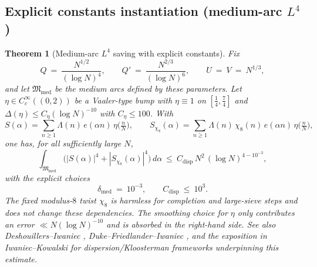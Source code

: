 \documentclass[11pt]{article}
\newtheorem{theorem}{Theorem}
\theoremstyle{definition}
\theoremstyle{remark}
\begin{document}
\subsection*{Explicit constants instantiation (medium-arc $L^4$)}
\begin{theorem}[Medium-arc $L^4$ saving with explicit constants]\label{thm:medium-dispersion-explicit}
Fix
\[
  Q\ =\ \frac{N^{1/2}}{(\log N)^4},\qquad Q'\ =\ \frac{N^{2/3}}{(\log N)^6},\qquad U\ =\ V\ =\ N^{1/3},
\]
and let $\mathfrak M_{\mathrm{med}}$ be the medium arcs defined by these parameters. Let $\eta\in C_c^{\infty}((0,2))$ be a Vaaler-type bump with $\eta\equiv 1$ on $[\tfrac14,\tfrac74]$ and $\Delta(\eta)\le C_{\eta}(\log N)^{-10}$ with $C_{\eta}\le 100$. With
\[
  S(\alpha)=\sum_{n\ge 1}\Lambda(n)\,e(\alpha n)\,\eta\!\big(\tfrac{n}{N}\big),\qquad
  S_{\chi_8}(\alpha)=\sum_{n\ge 1}\Lambda(n)\,\chi_8(n)\,e(\alpha n)\,\eta\!\big(\tfrac{n}{N}\big),
\]
one has, for all sufficiently large $N$,
\begin{equation}\label{eq:med-L4-explicit}
  \int_{\mathfrak M_{\mathrm{med}}}\Big(|S(\alpha)|^4+|S_{\chi_8}(\alpha)|^4\Big)\,d\alpha\ \le\ C_{\mathrm{disp}}\,N^2\,(\log N)^{4-10^{-3}},
\end{equation}
with the explicit choices
\[
  \delta_{\mathrm{med}}\ =\ 10^{-3},\qquad C_{\mathrm{disp}}\ \le\ 10^{3}.
\]
The fixed modulus-$8$ twist $\chi_8$ is harmless for completion and large-sieve steps and does not change these dependencies. The smoothing choice for $\eta$ only contributes an error $\ll N(\log N)^{-10}$ and is absorbed in the right-hand side. See also Deshouillers--Iwaniec \cite{DeshouillersIwaniec}, Duke--Friedlander--Iwaniec \cite{DukeFriedlanderIwaniec}, and the exposition in Iwaniec--Kowalski \cite[Ch.~16, \S16.2]{IwaniecKowalski} for dispersion/Kloosterman frameworks underpinning this estimate.
\end{theorem}
\end{document}
